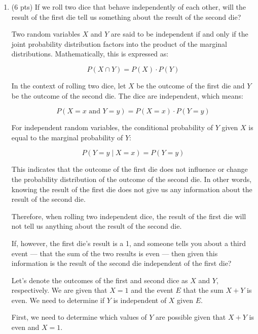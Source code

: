 \documentclass[letter]{article}
\theoremstyle{definition}
\newenvironment{soln}{
	\leavevmode\color{black}\ignorespaces
}{}
\begin{document}
\begin{enumerate}
		\item (6 pts) If we roll two dice that behave independently of each
		other, will the result of the first die tell us something about the
		result of the second die? 
		
    		\begin{soln}
    			
    			Two random variables \(X\) and \(Y\) are said to be independent if and only if the joint probability distribution factors into the product of the marginal distributions. Mathematically, this is expressed as:
    
    			\[
    			P(X \cap Y) = P(X) \cdot P(Y)
    			\]
    
    			In the context of rolling two dice, let \(X\) be the outcome of the first die and \(Y\) be the outcome of the second die. The dice are independent, which means:
    
    			\[
    			P(X = x \text{ and } Y = y) = P(X = x) \cdot P(Y = y)
    			\]
    
    			For independent random variables, the conditional probability of \(Y\) given \(X\) is equal to the marginal probability of \(Y\):
    
    			\[
    			P(Y = y \mid X = x) = P(Y = y)
    			\]
    
    			This indicates that the outcome of the first die does not influence or change the probability distribution of the outcome of the second die. In other words, knowing the result of the first die does not give us any information about the result of the second die.
    
    			Therefore, when rolling two independent dice, the result of the first die will not tell us anything about the result of the second die.
    		\end{soln}
    		
		
            If, however, the first die's result is a 1,
		and someone tells you about a third event --- that the sum of the two
		results is even --- then given this information is the result of the second die independent of the first die? 
		
		\begin{soln}
			Let's denote the outcomes of the first and second dice as \(X\) and \(Y\), respectively. We are given that \(X = 1\) and the event \(E\) that the sum \(X + Y\) is even. We need to determine if \(Y\) is independent of \(X\) given \(E\). 

			First, we need to determine which values of \(Y\) are possible given that \(X + Y\) is even and \(X = 1\). 


\end{soln}
\end{enumerate}
\end{document}
